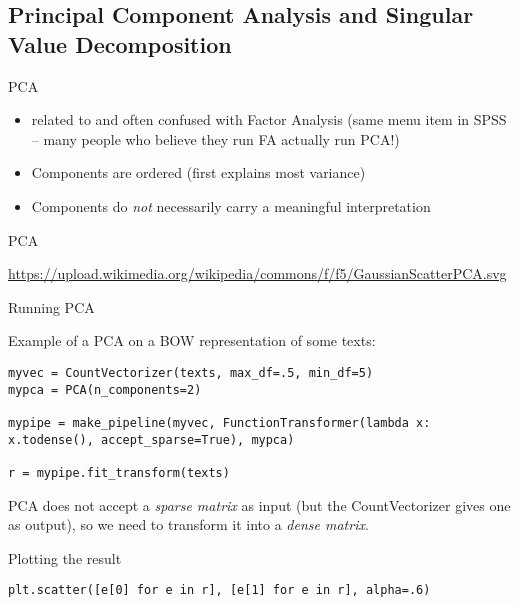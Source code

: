 \documentclass[compress]{beamer}
\begin{document}
\subsection{Principal Component Analysis and Singular Value Decomposition}


\begin{frame}{PCA}
\begin{itemize}
\item related to and often confused with Factor Analysis (same menu item in SPSS -- many people who believe they run FA actually run PCA!)
\item Components are ordered (first explains most variance)
\item Components do \emph{not} necessarily carry a meaningful interpretation
\end{itemize}
\end{frame}

\begin{frame}{PCA}

\tiny{\url{https://upload.wikimedia.org/wikipedia/commons/f/f5/GaussianScatterPCA.svg}}
\end{frame}


\begin{frame}{Running PCA}
	
Example of a PCA on a BOW representation of some texts:


\begin{lstlisting}
myvec = CountVectorizer(texts, max_df=.5, min_df=5)
mypca = PCA(n_components=2)

mypipe = make_pipeline(myvec, FunctionTransformer(lambda x: x.todense(), accept_sparse=True), mypca)

r = mypipe.fit_transform(texts)
\end{lstlisting}


\small{PCA does not accept a \textit{sparse matrix} as input (but the CountVectorizer gives one as output), so we need to transform it into a \textit{dense matrix}.}


\end{frame}



\begin{frame}{Plotting the result}
\begin{lstlisting}
plt.scatter([e[0] for e in r], [e[1] for e in r], alpha=.6)
\end{lstlisting}



\end{frame}
\end{document}
